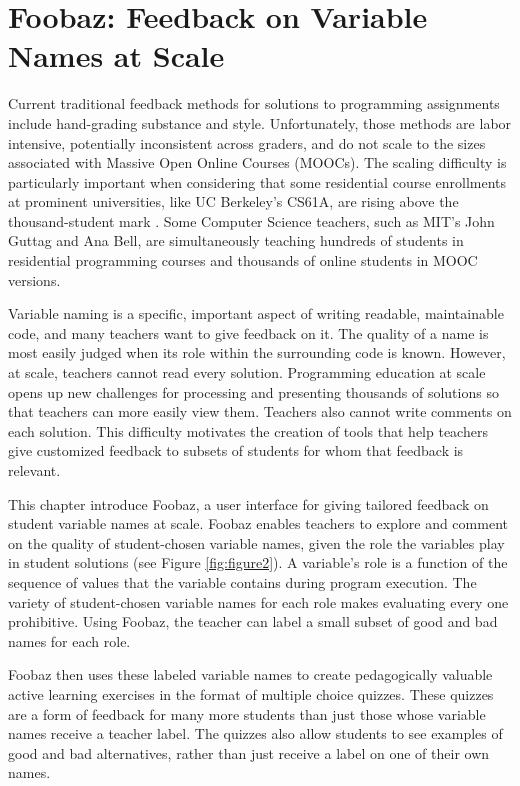 \chapter{Foobaz: Feedback on Variable Names at Scale}\label{chapter:foobaz}

Current traditional feedback methods for solutions to programming assignments include hand-grading substance and style. Unfortunately, those methods are labor intensive, potentially inconsistent across graders, and do not scale to the sizes associated with Massive Open Online Courses (MOOCs). The scaling difficulty is particularly important when considering that  some residential course enrollments at prominent universities, like UC Berkeley's CS61A, are rising above the thousand-student mark \cite{biggestClass}. Some Computer Science teachers, such as MIT's John Guttag and Ana Bell, are simultaneously teaching hundreds of students in residential programming courses and thousands of online students in MOOC versions.

Variable naming is a specific, important aspect of writing readable, maintainable code, and many teachers want to give feedback on it. The quality of a name is most easily judged when its role within the surrounding code is known. However, at scale, teachers cannot read every solution. Programming education at scale opens up new challenges for processing and presenting thousands of solutions so that teachers can more easily view them. Teachers also cannot write comments on each solution. This difficulty motivates the creation of tools that help teachers give customized feedback to subsets of students for whom that feedback is relevant.

This chapter introduce Foobaz, a user interface for giving tailored feedback on student variable names at scale. Foobaz enables teachers to explore and comment on the quality of student-chosen variable names, given the role the variables play in student solutions (see Figure \ref{fig:figure2}). A variable's role is a function of the sequence of values that the variable contains during program execution. The variety of student-chosen variable names for each role makes evaluating every one prohibitive. Using Foobaz, the teacher can label a small subset of good and bad names for each role. 

Foobaz then uses these labeled variable names to create pedagogically valuable active learning exercises in the format of multiple choice quizzes. These quizzes are a form of feedback for many more students than just those whose variable names receive a teacher label. The quizzes also allow students to see examples of good and bad alternatives, rather than just receive a label on one of their own names. 


